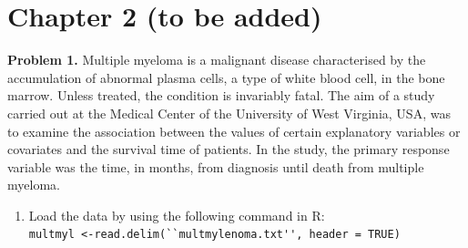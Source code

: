 \documentclass[12pt]{article}
\begin{document}
\section{Chapter 2 (to be added)}

\textbf{Problem 1.} Multiple myeloma is a malignant disease characterised by the accumulation
of abnormal plasma cells, a type of white blood cell, in the bone marrow. Unless
treated, the condition is invariably fatal. The aim of a study carried out at
the Medical Center of the University of West Virginia, USA, was to examine the association between the values of certain explanatory variables or covariates and the survival time of patients. In the study, the primary response
variable was the time, in months, from diagnosis until death from multiple
myeloma.
\begin{enumerate}
\item Load the data by using the following command in R: \\

 \lstinline{multmyl <-read.delim(``multmylenoma.txt'', header = TRUE)}
\end{enumerate} 
\end{document}
